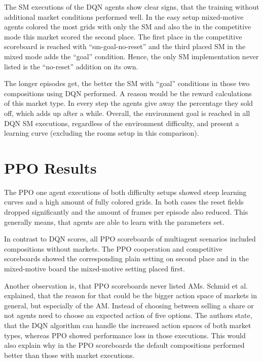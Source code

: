 The SM executions of the DQN agents show clear signs, that the training without additional market conditions performed well. In the easy setup mixed-motive agents colored the most grids with only the SM and also the in the competitive mode this market scored the second place. The first place in the competitive scoreboard is reached with ``sm-goal-no-reset'' and the third placed SM in the mixed mode adds the ``goal'' condition. Hence, the only SM implementation never listed is the ``no-reset'' addition on its own.

The longer episodes get, the better the SM with ``goal'' conditions in those two compositions using DQN performed. A reason would be the reward calculations of this market type. In every step the agents give away the percentage they sold off, which adds up after a while. Overall, the environment goal is reached in all DQN SM executions, regardless of the environment difficulty, and present a learning curve (excluding the rooms setup in this comparison).

\section{PPO Results}\label{ppo_results}
The PPO one agent executions of both difficulty setups showed steep learning curves and a high amount of fully colored grids. In both cases the reset fields dropped significantly and the amount of frames per episode also reduced. This generally means, that agents are able to learn with the parameters set.

In contrast to DQN scores, all PPO scoreboards of multiagent scenarios included compositions without markets. The PPO cooperation and competitive scoreboards showed the corresponding plain setting on second place and in the mixed-motive board the mixed-motive setting placed first.

Another observation is, that PPO scoreboards never listed AMs. Schmid et al. \cite{scbe21} explained, that the reason for that could be the bigger action space of markets in general, but especially of the AM. Instead of choosing between selling a share or not agents need to choose an expected action of five options. The authors state, that the DQN algorithm can handle the increased action spaces of both market types, whereas PPO showed performance loss in those executions. This would also explain why in the PPO scoreboards the default compositions performed better than those with market executions. 


